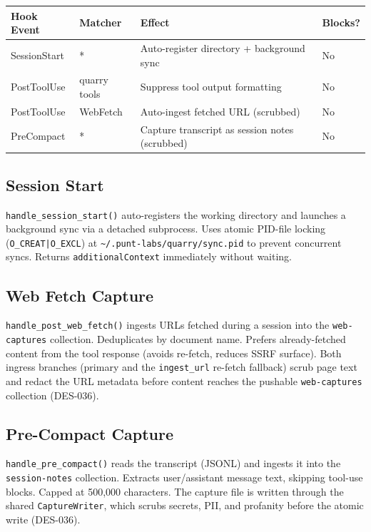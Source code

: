 \documentclass[a4paper,10pt]{article}
\begin{document}
\begin{center}
\begin{tabular}{llp{5cm}l}
\toprule
\textbf{Hook Event} & \textbf{Matcher} & \textbf{Effect} &
  \textbf{Blocks?} \\
\midrule
SessionStart  & * & Auto-register directory + background sync &
  No \\
PostToolUse   & quarry tools & Suppress tool output formatting &
  No \\
PostToolUse   & WebFetch & Auto-ingest fetched URL (scrubbed) &
  No \\
PreCompact    & * & Capture transcript as session notes (scrubbed) &
  No \\
\bottomrule
\end{tabular}
\end{center}

\subsection{Session Start}

\texttt{handle\_session\_start()} auto-registers the working directory
and launches a background sync via a detached subprocess.  Uses
atomic PID-file locking (\texttt{O\_CREAT|O\_EXCL}) at
\texttt{\~{}/.punt-labs/quarry/sync.pid} to prevent concurrent syncs.  Returns
\texttt{additionalContext} immediately without waiting.

\subsection{Web Fetch Capture}

\texttt{handle\_post\_web\_fetch()} ingests URLs fetched during a
session into the \texttt{web-captures} collection.  Deduplicates by
document name.  Prefers already-fetched content from the tool response
(avoids re-fetch, reduces SSRF surface).  Both ingress branches (primary
and the \texttt{ingest\_url} re-fetch fallback) scrub page text and
redact the URL metadata before content reaches the pushable
\texttt{web-captures} collection (DES-036).

\subsection{Pre-Compact Capture}

\texttt{handle\_pre\_compact()} reads the transcript (JSONL) and
ingests it into the \texttt{session-notes} collection.  Extracts
user/assistant message text, skipping tool-use blocks.  Capped at
500{,}000 characters.  The capture file is written through the shared
\texttt{CaptureWriter}, which scrubs secrets, PII, and profanity before
the atomic write (DES-036).
\end{document}
